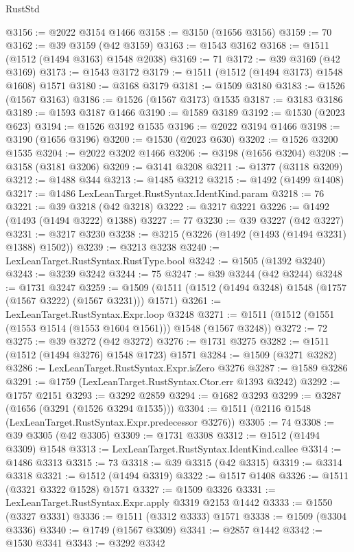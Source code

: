 \begin{lexlean}{RustStd}
\begin{coremodule}
{{@3156 := @2022 @3154 @1466
@3158 := @3150 (@1656 @3156)
@3159 := 70
@3162 := @39 @3159 (@42 @3159)
@3163 := @1543 @3162
@3168 := @1511 (@1512 (@1494 @3163) @1548 @2038)
@3169 := 71
@3172 := @39 @3169 (@42 @3169)
@3173 := @1543 @3172
@3179 := @1511 (@1512 (@1494 @3173) @1548 @1608) @1571
@3180 := @3168 @3179
@3181 := @1509 @3180
@3183 := @1526 (@1567 @3163)
@3186 := @1526 (@1567 @3173) @1535
@3187 := @3183 @3186
@3189 := @1593 @3187 @1466
@3190 := @1589 @3189
@3192 := @1530 (@2023 @623)
@3194 := @1526 @3192 @1535
@3196 := @2022 @3194 @1466
@3198 := @3190 (@1656 @3196)
@3200 := @1530 (@2023 @630)
@3202 := @1526 @3200 @1535
@3204 := @2022 @3202 @1466
@3206 := @3198 (@1656 @3204)
@3208 := @3158 (@3181 @3206)
@3209 := @3141 @3208
@3211 := @1377 (@3118 @3209)
@3212 := @1488 @344
@3213 := @1485 @3212
@3215 := @1492 (@1499 @1408)
@3217 := @1486 LexLeanTarget.RustSyntax.IdentKind.param
@3218 := 76
@3221 := @39 @3218 (@42 @3218)
@3222 := @3217 @3221
@3226 := @1492 (@1493 (@1494 @3222) @1388)
@3227 := 77
@3230 := @39 @3227 (@42 @3227)
@3231 := @3217 @3230
@3238 := @3215 (@3226 (@1492 (@1493 (@1494 @3231) @1388) @1502))
@3239 := @3213 @3238
@3240 := LexLeanTarget.RustSyntax.RustType.bool
@3242 := @1505 (@1392 @3240)
@3243 := @3239 @3242
@3244 := 75
@3247 := @39 @3244 (@42 @3244)
@3248 := @1731 @3247
@3259 := @1509 (@1511 (@1512 (@1494 @3248) @1548 (@1757 (@1567 @3222) (@1567 @3231))) @1571)
@3261 := LexLeanTarget.RustSyntax.Expr.loop @3248
@3271 := @1511 (@1512 (@1551 (@1553 @1514 (@1553 @1604 @1561))) @1548 (@1567 @3248))
@3272 := 72
@3275 := @39 @3272 (@42 @3272)
@3276 := @1731 @3275
@3282 := @1511 (@1512 (@1494 @3276) @1548 @1723) @1571
@3284 := @1509 (@3271 @3282)
@3286 := LexLeanTarget.RustSyntax.Expr.isZero @3276
@3287 := @1589 @3286
@3291 := @1759 (LexLeanTarget.RustSyntax.Ctor.err @1393 @3242)
@3292 := @1757 @2151
@3293 := @3292 @2859
@3294 := @1682 @3293
@3299 := @3287 (@1656 (@3291 (@1526 @3294 @1535)))
@3304 := @1511 (@2116 @1548 (LexLeanTarget.RustSyntax.Expr.predecessor @3276))
@3305 := 74
@3308 := @39 @3305 (@42 @3305)
@3309 := @1731 @3308
@3312 := @1512 (@1494 @3309) @1548
@3313 := LexLeanTarget.RustSyntax.IdentKind.callee
@3314 := @1486 @3313
@3315 := 73
@3318 := @39 @3315 (@42 @3315)
@3319 := @3314 @3318
@3321 := @1512 (@1494 @3319)
@3322 := @1517 @1408
@3326 := @1511 (@3321 @3322 @1528) @1571
@3327 := @1509 @3326
@3331 := LexLeanTarget.RustSyntax.Expr.apply @3319 @2153 @1442
@3333 := @1550 (@3327 @3331)
@3336 := @1511 (@3312 @3333) @1571
@3338 := @1509 (@3304 @3336)
@3340 := @1749 (@1567 @3309)
@3341 := @2857 @1442
@3342 := @1530 @3341
@3343 := @3292 @3342
}}
\end{coremodule}
\end{lexlean}
